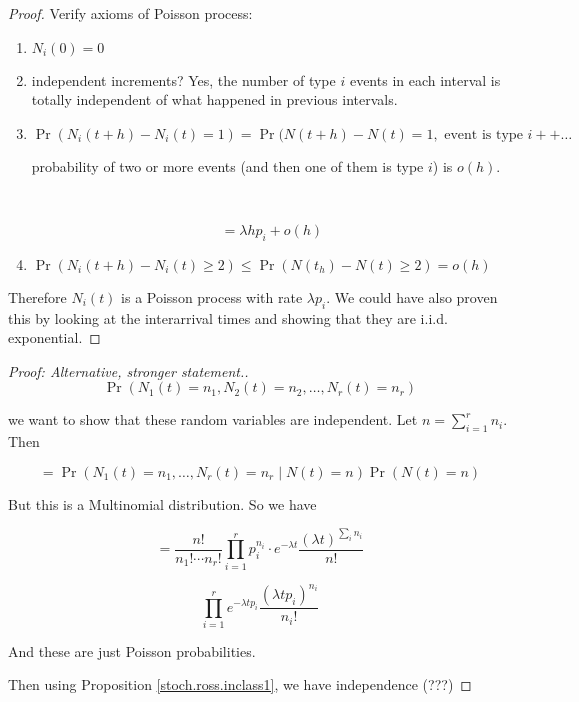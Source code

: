 \begin{proof} Verify axioms of Poisson process: 

\begin{enumerate}[1.]

\item \(N_i(0) = 0\)

\item independent increments? Yes, the number of type \(i\) events in each interval is totally independent of what happened in previous intervals.

\item \(\Pr(N_i(t+h) - N_i(t) = 1) = \Pr(N(t+h) - N(t) = 1, \text{ event is type } i +  + \ldots\)

probability of two or more events (and then one of them is type \(i\)) is \(o(h)\).

\

\[
= \lambda h p_i + o(h)
\]

\item \(\Pr(N_i(t+h) - N_i(t) \geq 2) \leq \Pr(N(t_h) - N(t) \geq 2 ) = o(h) \)

\end{enumerate}

Therefore \(N_i(t)\) is a Poisson process with rate \(\lambda p_i\). We could have also proven this by looking at the interarrival times and showing that they are i.i.d. exponential.

\end{proof}

\begin{proof}[Proof: Alternative, stronger statement.]

\[
\Pr(N_1(t) = n_1, N_2(t) = n_2, \ldots, N_r(t) = n_r)
\]

we want to show that these random variables are independent. Let \(n = \sum_{i=1}^r n_i\). Then

\[
= \Pr(N_1(t) = n_1, \ldots, N_r(t) = n_r \mid N(t) = n) \Pr(N(t) =n)
\]

But this is a Multinomial distribution. So we have

\[
= \frac{n!}{n_1! \cdots n_r!}\prod_{i=1}^r p_i^{n_i}\cdot e^{-\lambda t} \frac{(\lambda t)^{\sum_i n_i} }{n!}
\]

\[
\prod_{i=1}^r e^{-\lambda t p_i} \frac{(\lambda t p_i)^{n_i}}{n_i!}
\]

And these are just Poisson probabilities.

Then using Proposition \ref{stoch.ross.inclass1}, we have independence (???)
\end{proof}


